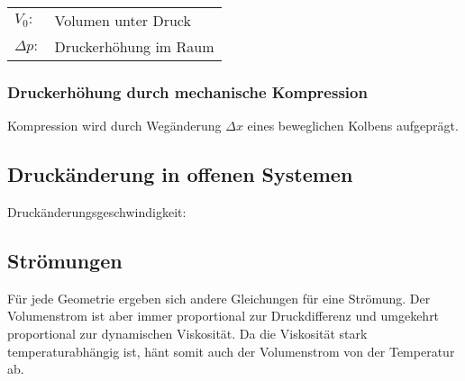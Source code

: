 \documentclass[landscape,a4paper,10pt]{article}
\begin{document}
\begin{multicols*}{3}
\begin{tabular}{ll}
$V_0:$ & Volumen unter Druck \\
$\Delta p:$ &Druckerhöhung im Raum
\end{tabular}

\subsubsection{Druckerhöhung durch mechanische Kompression}
Kompression wird durch Wegänderung $\Delta x$ eines beweglichen Kolbens aufgeprägt.








\subsection{Druckänderung in offenen Systemen}
Druckänderungsgeschwindigkeit:



\vfill
\columnbreak
\subsection{Strömungen}
Für jede Geometrie ergeben sich andere Gleichungen für eine Strömung. Der Volumenstrom ist aber immer proportional zur Druckdifferenz und umgekehrt proportional zur dynamischen Viskosität. Da die Viskosität stark temperaturabhängig ist, hänt somit auch der Volumenstrom von der Temperatur ab. 


\end{multicols*}
\end{document}
